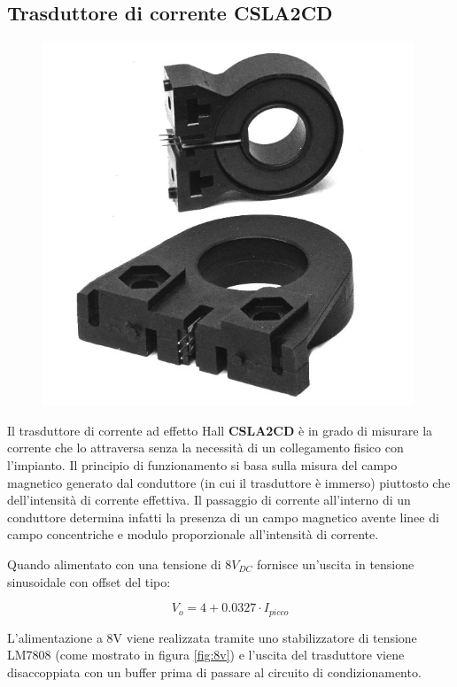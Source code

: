 \subsection{Trasduttore di corrente CSLA2CD}

\begin{figure}
    \centering
    \includegraphics[scale=0.3]{corrente/csla2cd.png}
\end{figure}


Il trasduttore di corrente ad effetto Hall \textbf{CSLA2CD} è in grado di misurare la
corrente che lo attraversa senza la necessità di un collegamento fisico con
l'impianto. Il principio di funzionamento si basa sulla misura del campo
magnetico generato dal conduttore (in cui il trasduttore è immerso) piuttosto
che dell'intensità di corrente effettiva. Il passaggio di corrente all'interno
di un conduttore determina infatti la presenza di un campo magnetico avente
linee di campo concentriche e modulo proporzionale all'intensità di corrente.

\vspace{12mm}

Quando alimentato con una tensione di $8V_{DC}$ fornisce un'uscita in tensione sinusoidale con offset del tipo:

\begin{equation}
    V_o = 4 + 0.0327 \cdot I_{picco}
\end{equation}

L'alimentazione a 8V viene realizzata tramite uno stabilizzatore di tensione
LM7808 (come mostrato in figura \ref{fig:8v}) e l'uscita del trasduttore viene disaccoppiata
con un buffer prima di passare al circuito di condizionamento.

